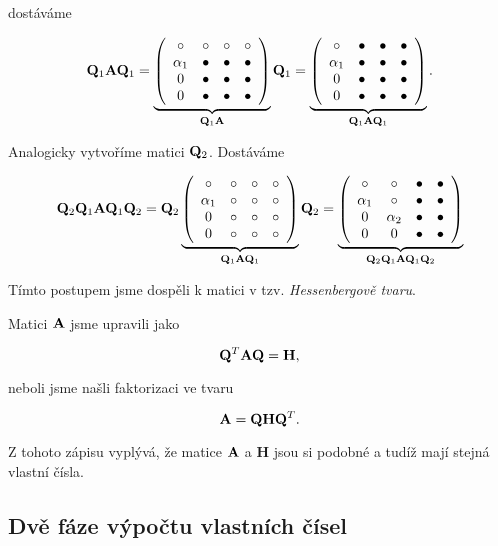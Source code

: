 \noindent dostáváme

\[ \mQ_1\mA\mQ_1 = \underbrace{\pmat{cccc}{ \circ &  \circ  &  \circ  &  \circ \\ \alpha_1 &  \bullet  &  \bullet  &  \bullet \\ 0 &  \bullet  &  \bullet &  \bullet  \\ 0 &  \bullet  &  \bullet &  \bullet \\}}_{\mQ_1\mA} \mQ_1 = \underbrace{\pmat{cccc}{ \circ    &  \bullet  &  \bullet  &  \bullet \\ \alpha_1 &  \bullet  &  \bullet  &  \bullet \\ 0        &  \bullet  &  \bullet  &  \bullet \\ 0        &  \bullet  &  \bullet  &  \bullet \\ }}_{\mQ_1\mA\mQ_1}. \]

\noindent Analogicky vytvoříme matici $\mQ_2$. Dostáváme

\[ \mQ_2\mQ_1\mA\mQ_1\mQ_2 = \mQ_2 \underbrace{\pmat{cccc}{ \circ    &  \circ    &  \circ    &  \circ \\ \alpha_1 &  \circ    &  \circ    &  \circ \\ 0        &  \circ    &  \circ    &  \circ \\ 0        &  \circ    &  \circ    &  \circ \\}}_{\mQ_1\mA\mQ_1} \mQ_2 = \underbrace{\pmat{cccc}{ \circ    &  \circ    &  \bullet  &  \bullet \\ \alpha_1 &  \circ    &  \bullet  &  \bullet \\ 0        &  \alpha_2 &  \bullet  &  \bullet \\ 0        &  0        &  \bullet  &  \bullet \\}}_{\mQ_2\mQ_1\mA\mQ_1\mQ_2} \]

\noindent Tímto postupem jsme dospěli k matici v tzv. \emph{Hessenbergově tvaru}.

\noindent Matici $\mA$ jsme upravili jako

\[ \mQ^T\mA\mQ = \mathbf{H}, \]

\noindent neboli jsme našli faktorizaci ve tvaru

\[ \mA = \mQ \mathbf{H} \mQ^T. \]

\noindent Z tohoto zápisu vyplývá, že matice $\mA$ a $\mathbf{H}$ jsou si podobné a tudíž mají stejná vlastní čísla.

\subsection*{Dvě fáze výpočtu vlastních čísel}

